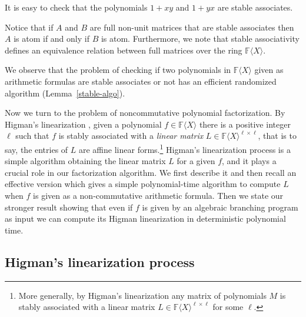 \documentclass[10pt,a4paper]{article}
\newcommand{\F}{\mathbb{F}}
\renewcommand{\angle}[1]{\langle #1 \rangle}
\newcommand{\FX}{\F\angle{X}}
\newcommand{\fR}{\FX}
\begin{document}
It is easy to check that the polynomials $1+xy$ and $1+yx$ are stable
associates.

Notice that if $A$ and $B$ are full non-unit matrices that are stable
associates then $A$ is atom if and only if $B$ is atom.  Furthermore,
we note that stable associativity defines an equivalence relation
between full matrices over the ring $\fR$.

We observe that the problem of checking if two polynomials in $\fR$ given as arithmetic formulas 
are stable associates or not has an efficient randomized algorithm
(Lemma~\ref{stable-algo}). 

%
%

%
%
%
%
%
%
%

%
%
%

Now we turn to the problem of noncommutative polynomial factorization.
By Higman's linearization \cite{Hig,Cohnfir}, given a polynomial
$f \in \fR$ there is a positive integer $\ell$ such that $f$ is stably
associated with a \emph{linear matrix} $L \in \fR^{\ell \times \ell}$,
that is to say, the entries of $L$ are affine linear
forms.\footnote{More generally, by Higman's linearization any matrix
  of polynomials $M$ is stably associated with a linear matrix
  $L \in \fR^{\ell \times \ell}$ for some $\ell$.}  Higman's
linearization process is a simple algorithm obtaining the linear
matrix $L$ for a given $f$, and it plays a crucial role in our
factorization algorithm. We first describe it and then recall an
effective version \cite{GGOW20} which gives a simple polynomial-time
algorithm to compute $L$ when $f$ is given as a non-commutative
arithmetic formula. Then we state our stronger result showing that
even if $f$ is given by an algebraic branching program as input
we can compute its Higman linearization in deterministic polynomial
time.

\subsection*{Higman's linearization process}

%
%
\end{document}

